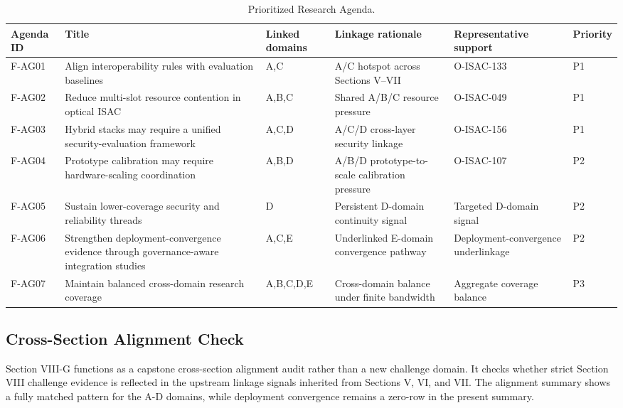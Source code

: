 \begin{table}[!t]
\caption{Prioritized Research Agenda.}
\label{tab:agenda}
\centering
\scriptsize
\begin{tabular}{p{} p{} p{} p{} p{} p{}}
\toprule
Agenda ID & Title & Linked domains & Linkage rationale & Representative support & Priority \\
\midrule
F-AG01 & Align interoperability rules with evaluation baselines & A,C & A/C hotspot across Sections V--VII & O-ISAC-133 & P1 \\
F-AG02 & Reduce multi-slot resource contention in optical ISAC & A,B,C & Shared A/B/C resource pressure & O-ISAC-049 & P1 \\
F-AG03 & Hybrid stacks may require a unified security-evaluation framework & A,C,D & A/C/D cross-layer security linkage & O-ISAC-156 & P1 \\
F-AG04 & Prototype calibration may require hardware-scaling coordination & A,B,D & A/B/D prototype-to-scale calibration pressure & O-ISAC-107 & P2 \\
F-AG05 & Sustain lower-coverage security and reliability threads & D & Persistent D-domain continuity signal & Targeted D-domain signal & P2 \\
F-AG06 & Strengthen deployment-convergence evidence through governance-aware integration studies & A,C,E & Underlinked E-domain convergence pathway & Deployment-convergence underlinkage & P2 \\
F-AG07 & Maintain balanced cross-domain research coverage & A,B,C,D,E & Cross-domain balance under finite bandwidth & Aggregate coverage balance & P3 \\
\bottomrule
\end{tabular}
\end{table}

\subsection{Cross-Section Alignment Check}

Section VIII-G functions as a capstone cross-section alignment audit rather than a new challenge domain. It checks whether strict Section VIII challenge evidence is reflected in the upstream linkage signals inherited from Sections V, VI, and VII. The alignment summary shows a fully matched pattern for the A-D domains, while deployment convergence remains a zero-row in the present summary.

